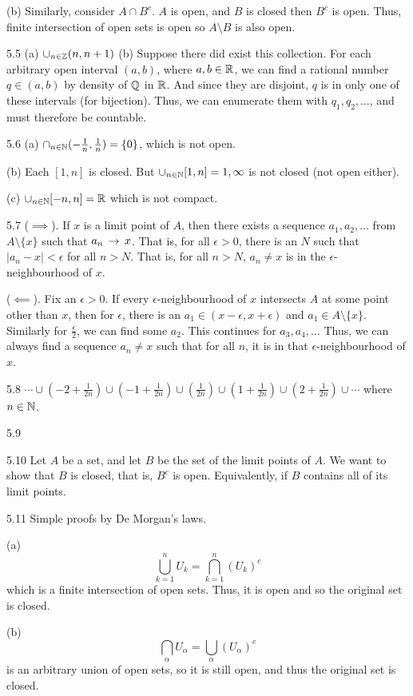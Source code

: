 (b) Similarly, consider $A \cap B^c$. $A$ is open, and $B$ is closed then $B^c$ is open. Thus, finite intersection of open sets is open so $A \setminus B$ is also open.

5.5 (a) $\cup_{n\in\mathbb{Z}}{(n,n+1)}$ 
(b) Suppose there did exist this collection. For each arbitrary open interval $(a,b)$, where $a,b \in \mathbb{R}$, we can find a rational number $q \in (a,b)$ by density of $\mathbb{Q}$ in $\mathbb{R}$.
And since they are disjoint, $q$ is in only one of these intervals (for bijection). Thus, we can enumerate them with $q_1, q_2, \dots$, and must therefore be countable.

5.6 (a) $\cap_{n \in \mathbb{N}}(-\frac{1}{n}, \frac{1}{n}) = \{0\}$, which is not open.

(b) Each $[1,n]$ is closed. But $\cup_{n \in \mathbb{N}}[1,n]=1,\infty$ is not closed (not open either).

(c) $\cup_{n\in\mathbb{N}}[-n,n]=\mathbb{R}$ which is not compact.

5.7 ($\implies$). If $x$ is a limit point of $A$, then there exists a sequence $a_1, a_2, \ldots$ from $A \setminus \{x\}$ such that $a_n \,\rightarrow\, x$. That is,
for all $\epsilon > 0$, there is an $N$ such that $|a_n - x| < \epsilon$ for all $n > N$.
That is, for all $n > N$, $a_n \neq x$ is in the $\epsilon$-neighbourhood of $x$. 

($\impliedby$). Fix an $\epsilon > 0$. If every $\epsilon$-neighbourhood of $x$ intersects $A$ at some point other than $x$, then
for $\epsilon$, there is an $a_1 \in (x-\epsilon, x+\epsilon)$ and $a_1 \in A \setminus \{x\}$. Similarly for $\frac{\epsilon}{2}$, we can find some $a_2$.
This continues for $a_3, a_4, \ldots$ Thus, we can always find a sequence $a_n \neq x$ such that for all $n$, it is in that $\epsilon$-neighbourhood of $x$.

5.8 $\cdots \cup (-2 + \frac{1}{2n})\cup (-1 + \frac{1}{2n}) \cup (\frac{1}{2n}) \cup (1 + \frac{1}{2n})\cup (2 + \frac{1}{2n})\cup \cdots$
where $n \in \mathbb{N}$.

5.9 

5.10 Let $A$ be a set, and let $B$ be the set of the limit points of $A$. We want to show that $B$ is closed,
that is, $B^c$ is open. Equivalently, if $B$ contains all of its limit points. 

5.11 Simple proofs by De Morgan's laws. 

(a) \[\bigcup_{k=1}^{n}U_k = \bigcap_{k=1}^{n} {(U_k)}^c\] which is a finite intersection of open sets. Thus, it is open and so the original set is closed.

(b) \[\bigcap_{\alpha}U_{\alpha}=\bigcup_{\alpha}{(U_{\alpha})}^{c}\]
is an arbitrary union of open sets, so it is still open, and thus the original set is closed.

